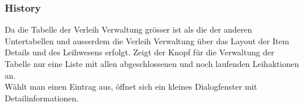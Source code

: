 \subsubsection{History}
Da die Tabelle der Verleih Verwaltung grösser ist als die der anderen Untertabellen und ausserdem die Verleih Verwaltung über das Layout der Item Details und des Leihwesens erfolgt. Zeigt der Knopf für die Verwaltung der Tabelle nur eine Liste mit allen abgeschlossenen und noch laufenden Leihaktionen an.\\
Wählt man einen Eintrag aus, öffnet sich ein kleines Dialogfenster mit Detailinformationen. 
